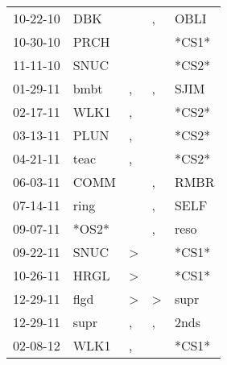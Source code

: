 \begin{supertabular}{p{0.07\textwidth}p{0.06\textwidth}p{0.02\textwidth}p{0.02\textwidth}p{0.06\textwidth}}
          10-22-10\textsuperscript{} &   DBK\textsuperscript{} &                  &             , &           OBLI\textsuperscript{} \\
          10-30-10\textsuperscript{} &  PRCH\textsuperscript{} &                  &               &                            *CS1* \\
          11-11-10\textsuperscript{} &  SNUC\textsuperscript{} &                  &               &                            *CS2* \\
          01-29-11\textsuperscript{} &  bmbt\textsuperscript{} &                , &             , &           SJIM\textsuperscript{} \\
          02-17-11\textsuperscript{} &  WLK1\textsuperscript{} &                , &               &                            *CS2* \\
          03-13-11\textsuperscript{} &  PLUN\textsuperscript{} &                , &               &                            *CS2* \\
          04-21-11\textsuperscript{} &  teac\textsuperscript{} &                , &               &                            *CS2* \\
          06-03-11\textsuperscript{} &  COMM\textsuperscript{} &                  &             , &           RMBR\textsuperscript{} \\
          07-14-11\textsuperscript{} &  ring\textsuperscript{} &                  &             , &           SELF\textsuperscript{} \\
          09-07-11\textsuperscript{} &                   *OS2* &                  &             , &           reso\textsuperscript{} \\
          09-22-11\textsuperscript{} &  SNUC\textsuperscript{} &     \textgreater &               &                            *CS1* \\
          10-26-11\textsuperscript{} &  HRGL\textsuperscript{} &     \textgreater &               &                            *CS1* \\
          12-29-11\textsuperscript{} &  flgd\textsuperscript{} &     \textgreater &  \textgreater &           supr\textsuperscript{} \\
          12-29-11\textsuperscript{} &  supr\textsuperscript{} &                , &             , &           2nds\textsuperscript{} \\
          02-08-12\textsuperscript{} &  WLK1\textsuperscript{} &                , &               &                            *CS1* \\

\end{supertabular}
